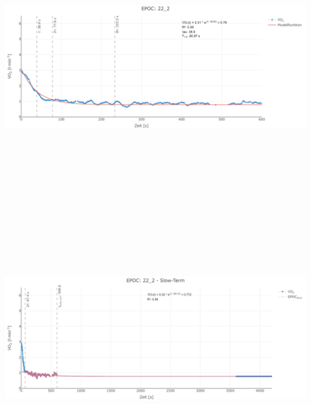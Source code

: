 \documentclass[
  letterpaper,
  DIV=11]{scrartcl}
\begin{document}
\includegraphics[width=11.45833in,height=4.6875in]{images/22_2_tau.png}
\includegraphics[width=11.45833in,height=4.6875in]{images/22_2_slow.png}
\end{document}

